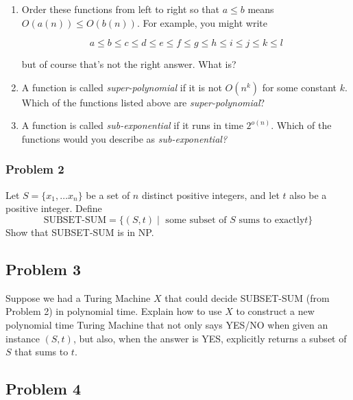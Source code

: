 \begin{enumerate}

\item Order these functions from left to right so that $a \leq b$ means $O(a(n))
 \leq O(b(n))$. For example, you might  write

\[ a \leq b \leq c \leq d \leq e \leq f \leq g \leq h \leq i \leq j \leq k \leq
l \]

but of course that's not the right answer. What is?

\item A function is called {\em super-polynomial\/} if it is not $O(n^k)$ for some constant $k$. Which of the functions listed above are {\em super-polynomial}?


\item A function is called {\em sub-exponential\/} if it runs in time
$2^{o(n)}$.  Which of the functions would you
describe as {\em sub-exponential?\/}

\end{enumerate} 


\newpage

\subsubsection*{Problem 2}

Let $S= \{ x_1, \ldots x_n \}$ be a set of $n$ distinct positive integers, and let $t$ also be a positive integer.  Define
\[ \mbox{SUBSET-SUM}  = \{ (S,t) \mid \mbox{ some subset of $S$ sums to exactly
$t$}  \} \]
Show that SUBSET-SUM is in NP.



\newpage

\subsection*{Problem 3}


Suppose we had a Turing Machine $X$ that could decide SUBSET-SUM (from Problem 2) in polynomial time. Explain how to use $X$ to construct a new polynomial time Turing Machine that not only says YES/NO when given an instance $(S,t)$, but also, when the answer is YES, explicitly returns a subset of $S$ that sums to $t$.



\newpage

\subsection*{Problem 4}


